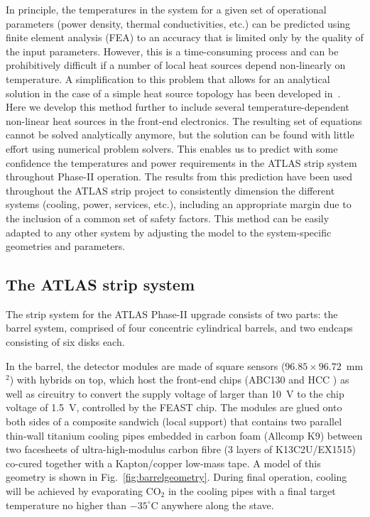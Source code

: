 In principle, the temperatures in the system for a given set of operational parameters (power density, thermal conductivities, etc.) can be predicted using finite element analysis (FEA) to an accuracy that is limited only by the quality of the input parameters. However, this is a time-consuming process and can be prohibitively difficult if a number of local heat sources depend non-linearly on temperature. A simplification to this problem that allows for an analytical solution in the case of a simple heat source topology has been developed in~\cite{Beck:2010zzd}. Here we develop this method further to include several temperature-dependent non-linear heat sources in the front-end electronics. The resulting set of equations cannot be solved analytically anymore, but the solution can be found with little effort using numerical problem solvers. This enables us to predict with some confidence the temperatures and power requirements in the ATLAS strip system throughout Phase-II operation. The results from this prediction have been used throughout the ATLAS strip project to consistently dimension the different systems (cooling, power, services, etc.), including an appropriate margin due to the inclusion of a common set of safety factors. This method can be easily adapted to any other system by adjusting the model to the system-specific geometries and parameters.

\subsection{The ATLAS strip system}
The strip system for the ATLAS Phase-II upgrade consists of two parts: the barrel system, comprised of four concentric cylindrical barrels, and two endcaps consisting of six disks each.

In the barrel, the detector modules are made of square sensors ($96.85\times 96.72$~mm$^2$) with hybrids on top, which host the front-end chips (ABC130 \cite{abc130} and HCC \cite{Collaboration:2017mtb}) as well as circuitry to convert the supply voltage of larger than 10~V to the chip voltage of 1.5~V, controlled by the FEAST chip. The modules are glued onto both sides of a composite sandwich (local support) that contains two parallel thin-wall titanium cooling pipes embedded in carbon foam (Allcomp K9)  between two facesheets of ultra-high-modulus carbon fibre (3 layers of K13C2U/EX1515) co-cured together with a Kapton/copper low-mass tape. A model of this geometry is shown in Fig.~\ref{fig:barrelgeometry}. During final operation, cooling will be achieved by evaporating CO$_2$ in the cooling pipes with a final target temperature no higher than $-35^\circ$C anywhere along the stave.

